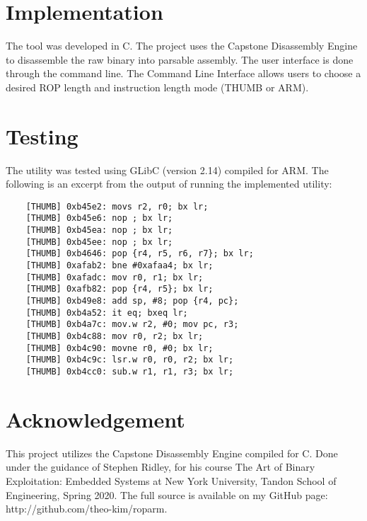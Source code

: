 \documentclass{article}
\begin{document}
\begin{multicols}{2}
    \section{Implementation}
    \par The tool was developed in C. The project uses the Capstone Disassembly Engine to disassemble the raw binary into parsable assembly. The user interface is done through the command line. The Command Line Interface allows users to choose a desired ROP length and instruction length mode (THUMB or ARM). 

    \section{Testing}
    \par The utility was tested using GLibC (version 2.14) compiled for ARM. The following is an excerpt from the output of running the implemented utility:
    \begin{verbatim}
    [THUMB]	0xb45e2: movs r2, r0; bx lr; 
    [THUMB]	0xb45e6: nop ; bx lr; 
    [THUMB]	0xb45ea: nop ; bx lr; 
    [THUMB]	0xb45ee: nop ; bx lr; 
    [THUMB]	0xb4646: pop {r4, r5, r6, r7}; bx lr; 
    [THUMB]	0xafab2: bne #0xafaa4; bx lr; 
    [THUMB]	0xafadc: mov r0, r1; bx lr; 
    [THUMB]	0xafb82: pop {r4, r5}; bx lr; 
    [THUMB]	0xb49e8: add sp, #8; pop {r4, pc}; 
    [THUMB]	0xb4a52: it eq; bxeq lr; 
    [THUMB]	0xb4a7c: mov.w r2, #0; mov pc, r3; 
    [THUMB]	0xb4c88: mov r0, r2; bx lr; 
    [THUMB]	0xb4c90: movne r0, #0; bx lr; 
    [THUMB]	0xb4c9c: lsr.w r0, r0, r2; bx lr; 
    [THUMB]	0xb4cc0: sub.w r1, r1, r3; bx lr; 
    \end{verbatim}

    \section*{Acknowledgement}
    This project utilizes the Capstone Disassembly Engine compiled for C. Done under the guidance of Stephen Ridley, for his course The Art of Binary Exploitation: Embedded Systems at New York University, Tandon School of Engineering, Spring 2020. The full source is available on my GitHub page: http://github.com/theo-kim/roparm.
    \end{multicols}
\end{document}

